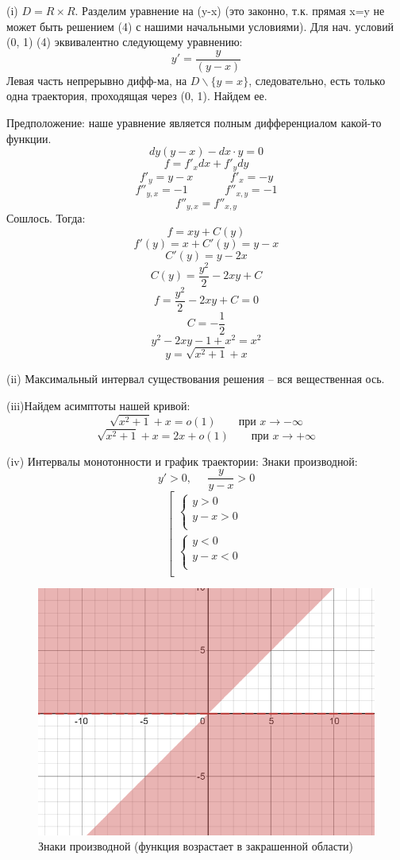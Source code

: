 \documentclass[a4paper, 12pt]{article}
\begin{document}
(i) $D = R \times R$. Разделим уравнение на (y-x) (это законно, т.к. прямая x=y не может быть решением (4) с нашими начальными условиями). Для нач. условий (0, 1) (4) эквивалентно следующему уравнению:
 \[y'=\frac {y}{(y-x)}\]
Левая часть непрерывно дифф-ма, на $D\backslash \{y=x\}$, следовательно, есть только одна траектория, проходящая через (0, 1).  Найдем ее.

Предположение: наше уравнение является полным дифференциалом какой-то функции.
\[dy(y-x)-dx\cdot y= 0\]
\[f = f'_xdx+f'_ydy\]
\[f'_y=y-x\;\;\;\;\;\;\;\;\;\;\;\; f'_x=-y\]
\[f''_{y, x}=-1\;\;\;\;\;\;\;\;\;\;\;\; f''_{x, y}=-1\]
\[f''_{y, x}=f''_{x, y}\]
Сошлось. Тогда:
\[f = xy+C(y)\]
\[f'(y)=x+C'(y)=y-x\]
\[C'(y)=y-2x\]
\[C(y)=\frac{y^2}{2}-2xy+C\]
\[f= \frac{y^2}{2}-2xy+C=0\]
\[C=-\frac 1 2 \]
\[y^2-2xy-1+x^2=x^2\]
\[y =  \sqrt{x^2+1}+x\]

(ii) Максимальный интервал существования решения -- вся вещественная ось. 

(iii)Найдем асимптоты  нашей кривой:
\[ \sqrt{x^2+1}+x = o(1) \quad \quad \text{при $x \rightarrow - \infty$}\]
\[ \sqrt{x^2+1}+x = 2x + o(1) \quad \quad \text{при $x \rightarrow + \infty$}\]

(iv) Интервалы монотонности и график траектории:
Знаки производной:
\[y' > 0,\;\;\;\;\; \frac y {y-x}>0\]
\[
\left[ 
  \begin{gathered} 
    \left\{ 
      \begin{gathered} 
        y  > 0
        \\ 
        y - x > 0
        \\
      \end{gathered} 
    \right.  
    \\ 
    \left\{ 
      \begin{gathered} 
        y  < 0
        \\ 
        y - x < 0
        \\
      \end{gathered} 
    \right.
    \\
  \end{gathered}
\right.
\]

\begin{figure}[H]
	\centering
	\includegraphics[scale=0.6]{9}
	\caption{Знаки производной (функция возрастает в закрашенной области)}
\end{figure}
\end{document}
